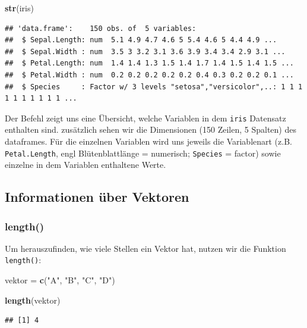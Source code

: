 \documentclass[
]{book}
\newenvironment{Shaded}{\begin{snugshade}}{\end{snugshade}}
\newcommand{\FunctionTok}[1]{\textcolor[rgb]{0.13,0.29,0.53}{\textbf{#1}}}
\newcommand{\NormalTok}[1]{#1}
\newcommand{\OtherTok}[1]{\textcolor[rgb]{0.56,0.35,0.01}{#1}}
\newcommand{\StringTok}[1]{\textcolor[rgb]{0.31,0.60,0.02}{#1}}
\begin{document}
\begin{Shaded}
\begin{Highlighting}[]
\FunctionTok{str}\NormalTok{(iris)}
\end{Highlighting}
\end{Shaded}

\begin{verbatim}
## 'data.frame':    150 obs. of  5 variables:
##  $ Sepal.Length: num  5.1 4.9 4.7 4.6 5 5.4 4.6 5 4.4 4.9 ...
##  $ Sepal.Width : num  3.5 3 3.2 3.1 3.6 3.9 3.4 3.4 2.9 3.1 ...
##  $ Petal.Length: num  1.4 1.4 1.3 1.5 1.4 1.7 1.4 1.5 1.4 1.5 ...
##  $ Petal.Width : num  0.2 0.2 0.2 0.2 0.2 0.4 0.3 0.2 0.2 0.1 ...
##  $ Species     : Factor w/ 3 levels "setosa","versicolor",..: 1 1 1 1 1 1 1 1 1 1 ...
\end{verbatim}

Der Befehl zeigt uns eine Übersicht, welche Variablen in dem \texttt{iris} Datensatz enthalten sind. zusätzlich sehen wir die Dimensionen (150 Zeilen, 5 Spalten) des dataframes. Für die einzelnen Variablen wird uns jeweils die Variablenart (z.B. \texttt{Petal.Length}, engl Blütenblattlänge = numerisch; \texttt{Species} = factor) sowie einzelne in dem Variablen enthaltene Werte.

\subsection{Informationen über Vektoren}\label{informationen-uxfcber-vektoren}

\subsubsection{length()}\label{length}

Um herauszufinden, wie viele Stellen ein Vektor hat, nutzen wir die Funktion \texttt{length()}:

\begin{Shaded}
\begin{Highlighting}[]
\NormalTok{vektor }\OtherTok{=} \FunctionTok{c}\NormalTok{(}\StringTok{"A"}\NormalTok{, }\StringTok{"B"}\NormalTok{, }\StringTok{"C"}\NormalTok{, }\StringTok{"D"}\NormalTok{)}

\FunctionTok{length}\NormalTok{(vektor)}
\end{Highlighting}
\end{Shaded}

\begin{verbatim}
## [1] 4
\end{verbatim}
\end{document}
